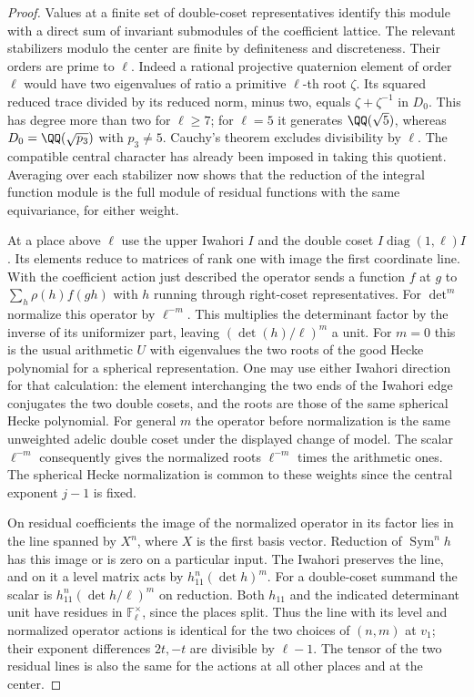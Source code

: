\documentclass[a4paper,11pt]{article}
\theoremstyle{definition}
\theoremstyle{remark}
\numberwithin{equation}{section}
\begin{document}
\begin{proof}
Values at a finite set of double-coset representatives
identify this module with a direct sum of invariant
submodules of the coefficient lattice. The relevant
stabilizers modulo the center are finite by definiteness
and discreteness. Their orders are prime to \(\ell\).
Indeed a rational projective quaternion element of order
\(\ell\) would have two eigenvalues of ratio a primitive
\(\ell\)-th root \(\zeta\). Its squared reduced trace
divided by its reduced norm, minus two, equals
\(\zeta+\zeta^{-1}\) in \(D_0\). This has degree more
than two for \(\ell\ge7\); for \(\ell=5\) it generates
\(\QQ(\sqrt5)\), whereas \(D_0=\QQ(\sqrt{p_3})\) with
\(p_3\ne5\). Cauchy's theorem excludes divisibility by
\(\ell\). The compatible central character has already
been imposed in taking this quotient. Averaging over each
stabilizer now shows that the reduction of the integral
function module is the full module of residual functions
with the same equivariance, for either weight.

At a place above \(\ell\) use the upper Iwahori \(I\)
and the double coset \(I\operatorname{diag}(1,\ell)I\).
Its elements reduce to matrices of rank one with image
the first coordinate line. With the coefficient action
just described the operator sends a function \(f\) at \(g\)
to \(\sum_h\rho(h)f(gh)\) with \(h\) running through
right-coset representatives. For \(\det^m\) normalize
this operator by \(\ell^{-m}\). This multiplies the
determinant factor by the inverse of its uniformizer
part, leaving \((\det(h)/\ell)^m\) a unit. For \(m=0\)
this is the usual arithmetic \(U\) with eigenvalues the
two roots of the good Hecke polynomial for a spherical
representation. One may use either Iwahori direction for
that calculation: the element interchanging the two ends
of the Iwahori edge conjugates the two double cosets, and
the roots are those of the same spherical Hecke polynomial.
For general \(m\) the operator before normalization is
the same unweighted adelic double coset under the displayed
change of model. The scalar \(\ell^{-m}\) consequently
gives the normalized roots \(\ell^{-m}\) times the
arithmetic ones. The spherical Hecke normalization is
common to these weights since the central exponent \(j-1\)
is fixed.

On residual coefficients the image of the normalized
operator in its factor lies in the line spanned by \(X^n\),
where \(X\) is the first basis vector. Reduction of
\(\operatorname{Sym}^n h\) has this image or is zero on
a particular input. The Iwahori preserves the line, and
on it a level matrix acts by \(h_{11}^n(\det h)^m\).
For a double-coset summand the scalar is
\(h_{11}^n(\det h/\ell)^m\) on reduction. Both \(h_{11}\)
and the indicated determinant unit have residues in
\(\mathbb F_\ell^\times\), since the places split.
Thus the line with its level and normalized operator actions
is identical for the two choices of \((n,m)\) at \(v_1\);
their exponent differences \(2t,-t\) are divisible by
\(\ell-1\). The tensor of the two residual lines is also
the same for the actions at all other places and at the
center.


\end{proof}
\end{document}
